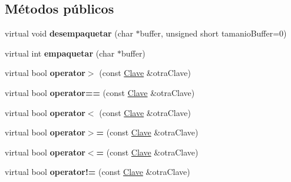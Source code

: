 \subsection*{\-Métodos públicos}
\begin{DoxyCompactItemize}
\item 
\hypertarget{class_clave_string_a420ca54a3e623eb996beeae18c8e04f0}{virtual void {\bfseries desempaquetar} (char $\ast$buffer, unsigned short tamanio\-Buffer=0)}\label{class_clave_string_a420ca54a3e623eb996beeae18c8e04f0}

\item 
\hypertarget{class_clave_string_a8b57e82e1aa5d4e26e367198c695b162}{virtual int {\bfseries empaquetar} (char $\ast$buffer)}\label{class_clave_string_a8b57e82e1aa5d4e26e367198c695b162}

\item 
\hypertarget{class_clave_string_a003e221988cdf3d75af228fd7889d88e}{virtual bool {\bfseries operator$>$} (const \hyperlink{class_clave}{\-Clave} \&otra\-Clave)}\label{class_clave_string_a003e221988cdf3d75af228fd7889d88e}

\item 
\hypertarget{class_clave_string_a7410bafc6148323776bf16203845f59b}{virtual bool {\bfseries operator==} (const \hyperlink{class_clave}{\-Clave} \&otra\-Clave)}\label{class_clave_string_a7410bafc6148323776bf16203845f59b}

\item 
\hypertarget{class_clave_string_aab5e56a39ffec1783aa3df7a587f5ef6}{virtual bool {\bfseries operator$<$} (const \hyperlink{class_clave}{\-Clave} \&otra\-Clave)}\label{class_clave_string_aab5e56a39ffec1783aa3df7a587f5ef6}

\item 
\hypertarget{class_clave_string_a573d3fbe96492c6a057fffab9c43a299}{virtual bool {\bfseries operator$>$=} (const \hyperlink{class_clave}{\-Clave} \&otra\-Clave)}\label{class_clave_string_a573d3fbe96492c6a057fffab9c43a299}

\item 
\hypertarget{class_clave_string_accd9dd53a3d64f7254add0761fba7a38}{virtual bool {\bfseries operator$<$=} (const \hyperlink{class_clave}{\-Clave} \&otra\-Clave)}\label{class_clave_string_accd9dd53a3d64f7254add0761fba7a38}

\item 
\hypertarget{class_clave_string_a32fe47cac187fdfad88ca0f78728c42a}{virtual bool {\bfseries operator!=} (const \hyperlink{class_clave}{\-Clave} \&otra\-Clave)}\label{class_clave_string_a32fe47cac187fdfad88ca0f78728c42a}


\end{DoxyCompactItemize}
